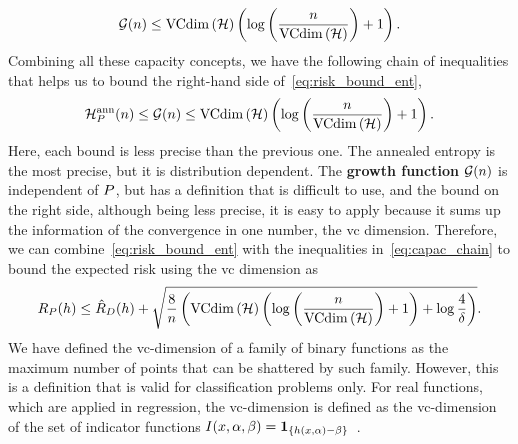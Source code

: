 \begin{equation}
    \label{eq:vcdim_ineq}
    \mathcal{G}(\nsamples) \leq \vcdim{\hypspace} \left(\log\left(\frac{\nsamples}{\vcdim{\hypspace}}\right) + 1 \right) .
\end{equation}
%
Combining all these capacity concepts, we have the following chain of inequalities that helps us to bound the right-hand side of~\eqref{eq:risk_bound_ent},
\begin{equation}
    \label{eq:capac_chain}
    \mathcal{H}^{\text{ann}}_{\distf}(\nsamples) \leq \mathcal{G}(\nsamples) \leq \vcdim{\hypspace} \left(\log\left(\frac{\nsamples}{\vcdim{\hypspace}}\right) + 1 \right).
\end{equation}
Here, each bound is less precise than the previous one. The annealed entropy is the most precise, but it is distribution dependent. The \textbf{growth function} $\mathcal{G}(n)$ is independent of $P$, but has a definition that is difficult to use, and the bound on the right side, although being less precise, it is easy to apply because it sums up the information of the convergence in one number, the \acrshort{vc} dimension.
%
Therefore, we can combine~\eqref{eq:risk_bound_ent} with the inequalities in~\eqref{eq:capac_chain} to bound the expected risk using the \acrshort{vc} dimension as
\begin{equation}
    \label{eq:risk_bound_vc}
    \exprisk(\hypf) \leq \emprisk(\hypf) + \sqrt{\frac{8}{\nsamples} \left(\vcdim{\hypspace} \left(\log\left(\frac{\nsamples}{\vcdim{\hypspace}}\right) + 1 \right) + \log \frac{4}{\delta} \right)} .
\end{equation}
%
We have defined the \acrshort{vc}-dimension of a family of binary functions as the maximum number of points that can be shattered by such family. However, this is a definition that is valid for classification problems only. For real functions, which are applied in regression, the \acrshort{vc}-dimension is defined as the \acrshort{vc}-dimension of the set of indicator functions $ I(x, \alpha, \beta) = \bm{1}_{\{h\left(x, \alpha\right) - \beta\}}$~\citep{vapnik1982estimation}.

